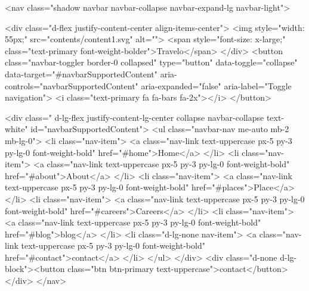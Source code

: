  <nav class="shadow navbar navbar-collapse navbar-expand-lg navbar-light">
                        
                            <div class="d-flex justify-content-center align-items-center">
                                <img style="width: 55px;" src="contents/content1.svg" alt="">
                                <span style="font-size: x-large;" class="text-primary font-weight-bolder">Travelo</span>
                            </div>
                        <button class="navbar-toggler border-0 collapsed" type="button" data-toggle="collapse" data-target="#navbarSupportedContent" aria-controls="navbarSupportedContent" aria-expanded="false" aria-label="Toggle navigation">
                            <i class="text-primary fa fa-bars fa-2x"></i>
                        </button>
    
                        <div class=" d-lg-flex justify-content-lg-center collapse navbar-collapse text-white" id="navbarSupportedContent">
                          <ul class="navbar-nav me-auto mb-2 mb-lg-0">
                            <li class="nav-item">
                              <a class="nav-link text-uppercase px-5 py-3 py-lg-0 font-weight-bold" href="#home">Home</a>
                            </li>
                            <li class="nav-item">
                              <a class="nav-link text-uppercase px-5 py-3 py-lg-0 font-weight-bold" href="#about">About</a>
                            </li>
                            <li class="nav-item">
                              <a class="nav-link text-uppercase px-5 py-3 py-lg-0 font-weight-bold" href="#places">Place</a>
                            </li>
                            <li class="nav-item">
                              <a class="nav-link text-uppercase px-5 py-3 py-lg-0 font-weight-bold" href="#careers">Careers</a>
                            </li>
                            <li class="nav-item">
                              <a class="nav-link text-uppercase px-5 py-3 py-lg-0 font-weight-bold" href="#blog">blog</a>
                            </li>
                            <li class="d-lg-none nav-item">
                              <a class="nav-link text-uppercase px-5 py-3 py-lg-0 font-weight-bold" href="#contact">contact</a>
                            </li>
                          </ul>
                        </div>
                        <div class="d-none d-lg-block"><button class="btn btn-primary text-uppercase">contact</button></div>
                    </nav>